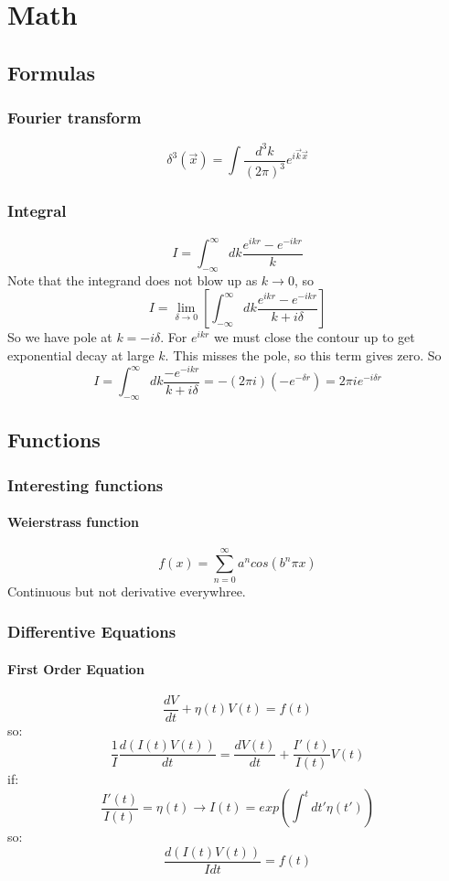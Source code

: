 \chapter{Math}

\section{Formulas}

\subsection{Fourier transform}
\[\delta^3(\vec{x})=\int\frac{d^3k}{(2\pi)^3}e^{i\vec{k}\vec{x}}\]

\subsection{Integral}
\[I=\int_{-\infty}^{\infty}dk\frac{e^{ikr}-e^{-ikr}}{k}\]
Note that the integrand does not blow up as $k \rightarrow 0$, so
\[I=\displaystyle\lim_{\delta\rightarrow{0}}\left[\int_{-\infty}^{\infty}dk\frac{e^{ikr}-e^{-ikr}}{k+i\delta}\right]\]
So we have pole at $k = -i\delta$. For $e^{ikr}$ we must close the contour
up to get exponential decay at large $\mathit{k}$. This misses the pole, so
this term gives zero. So
\[I=\int_{-\infty}^{\infty}dk\frac{-e^{-ikr}}{k+i\delta}=-(2\pi{i})(-e^{-\delta{r}})=2\pi{i}e^{-i\delta{r}}\]

\section{Functions}

\subsection{Interesting functions}
\subsubsection{Weierstrass function}
\begin{equation}
    f(x) = \sum_{n=0}^{\infty}a^{n}cos(b^{n}\pi x)
\end{equation}
Continuous but not derivative everywhree.


\subsection{Differentive Equations}

\subsubsection{First Order Equation}
$$ \frac{dV}{dt} + \eta(t)V(t) = f(t)  $$
so:
$$\frac{1}{I}\frac{d(I(t)V(t))}{dt} = \frac{dV(t)}{dt} +
\frac{I'(t)}{I(t)}V(t)$$
if: 
$$ \frac{I'(t)}{I(t)} = \eta(t)	\rightarrow I(t) =
exp(\int^{t}dt'\eta(t'))$$
so:
$$ \frac{d(I(t)V(t))}{I dt} = f(t)$$

